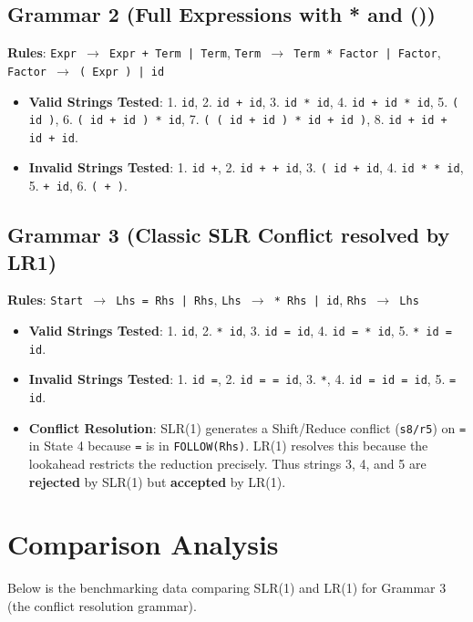 \documentclass[11pt,a4paper]{article}
\begin{document}
\subsection{Grammar 2 (Full Expressions with * and ())}
\textbf{Rules}: \texttt{Expr $\rightarrow$ Expr + Term | Term}, \texttt{Term $\rightarrow$ Term * Factor | Factor}, \texttt{Factor $\rightarrow$ ( Expr ) | id}
\begin{itemize}
    \item \textbf{Valid Strings Tested}: 1. \texttt{id}, 2. \texttt{id + id}, 3. \texttt{id * id}, 4. \texttt{id + id * id}, 5. \texttt{( id )}, 6. \texttt{( id + id ) * id}, 7. \texttt{( ( id + id ) * id + id )}, 8. \texttt{id + id + id + id}.
    \item \textbf{Invalid Strings Tested}: 1. \texttt{id +}, 2. \texttt{id + + id}, 3. \texttt{( id + id}, 4. \texttt{id * * id}, 5. \texttt{+ id}, 6. \texttt{( + )}.
\end{itemize}

\subsection{Grammar 3 (Classic SLR Conflict resolved by LR1)}
\textbf{Rules}: \texttt{Start $\rightarrow$ Lhs = Rhs | Rhs}, \texttt{Lhs $\rightarrow$ * Rhs | id}, \texttt{Rhs $\rightarrow$ Lhs}
\begin{itemize}
    \item \textbf{Valid Strings Tested}: 1. \texttt{id}, 2. \texttt{* id}, 3. \texttt{id = id}, 4. \texttt{id = * id}, 5. \texttt{* id = id}.
    \item \textbf{Invalid Strings Tested}: 1. \texttt{id =}, 2. \texttt{id = = id}, 3. \texttt{*}, 4. \texttt{id = id = id}, 5. \texttt{= id}.
    \item \textbf{Conflict Resolution}: SLR(1) generates a Shift/Reduce conflict (\texttt{s8/r5}) on \texttt{=} in State 4 because \texttt{=} is in \texttt{FOLLOW(Rhs)}. LR(1) resolves this because the lookahead restricts the reduction precisely. Thus strings 3, 4, and 5 are \textbf{rejected} by SLR(1) but \textbf{accepted} by LR(1).
\end{itemize}

\section{Comparison Analysis}
Below is the benchmarking data comparing SLR(1) and LR(1) for Grammar 3 (the conflict resolution grammar).
\end{document}
